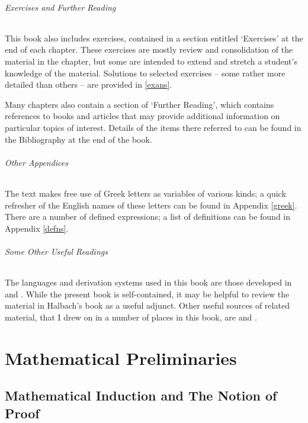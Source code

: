 \documentclass[openany,leqno,10pt]{book}
\theoremstyle{break}
\theoremstyle{definition}
\theoremstyle{remark}
\begin{document}
\paragraph{Exercises and Further Reading} This book also includes exercises, contained in a section entitled `Exercises' at the end of each chapter. These exercises are mostly review and consolidation of the material in the chapter, but some are intended to extend and stretch a student's knowledge of the material. Solutions to selected exercises – some rather more detailed than others – are provided in \autoref{exans}.

Many chapters also contain a section of `Further Reading', which contains references to books and articles that may provide additional information on particular topics of interest. Details of the items there referred to can be found in the Bibliography at the end of the book.

\paragraph{Other Appendices} The text makes free use of Greek letters as variables of various kinds; a quick refresher of the English names of these letters can be found in Appendix \ref{greek}. There are a number of defined expressions; a list of definitions can be found in Appendix \ref{defns}.

\paragraph{Some Other Useful Readings} The languages and derivation systems used in this book are those developed in \citep{hallogma} and . While the present book is self-contained, it may be helpful to review the material in Halbach's book as a useful adjunct. Other useful sources of related material, that I drew on in a number of places in this book, are \citet{bevpospa,bosintlo,bbjcomlo,priintncl} and \citet{sidlfp}.  

\part{Mathematical Preliminaries} \label{p:prelim}



\chapter[Mathematical Induction and Proof]{Mathematical Induction and The Notion of Proof}\label{c:induct} %
 
\end{document}
